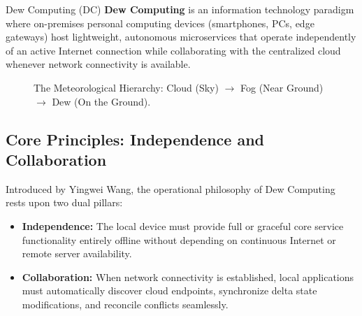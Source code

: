 \documentclass[11pt,a4paper,openany]{report}
\begin{document}
\begin{defbox}{Dew Computing (DC)}
\textbf{Dew Computing} is an information technology paradigm where on-premises personal computing devices (smartphones, PCs, edge gateways) host lightweight, autonomous microservices that operate independently of an active Internet connection while collaborating with the centralized cloud whenever network connectivity is available.
\end{defbox}

\begin{figure}[H]
\centering
{}
\caption{The Meteorological Hierarchy: Cloud (Sky) $\to$ Fog (Near Ground) $\to$ Dew (On the Ground).}
\end{figure}

\subsection{Core Principles: Independence and Collaboration}
Introduced by Yingwei Wang, the operational philosophy of Dew Computing rests upon two dual pillars:
\begin{itemize}[leftmargin=*]
  \item \textbf{Independence:} The local device must provide full or graceful core service functionality entirely offline without depending on continuous Internet or remote server availability.
  \item \textbf{Collaboration:} When network connectivity is established, local applications must automatically discover cloud endpoints, synchronize delta state modifications, and reconcile conflicts seamlessly.
\end{itemize}
\end{document}
